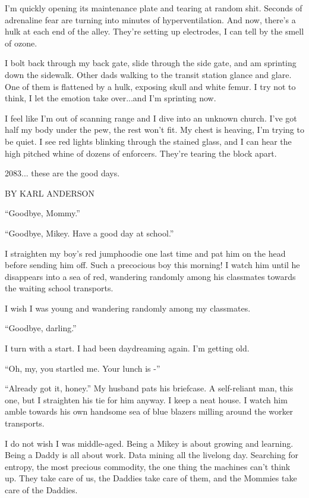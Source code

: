 \documentclass{amsbook}
\begin{document}
I'm quickly opening its maintenance plate and tearing at random shit.  Seconds of adrenaline fear are turning into minutes of hyperventilation.  And now, there's a hulk at each end of the alley.  They're setting up electrodes, I can tell by the smell of ozone.

I bolt back through my back gate, slide through the side gate, and am sprinting down the sidewalk.  Other dads walking to the transit station glance and glare.  One of them is flattened by a hulk, exposing skull and white femur.  I try not to think, I let the emotion take over...and I'm sprinting now.

I feel like I'm out of scanning range and I dive into an unknown church.  I've got half my body under the pew, the rest won't fit.  My chest is heaving, I'm trying to be quiet.  I see red lights blinking through the stained glass, and I can hear the high pitched whine of dozens of enforcers.  They're tearing the block apart.

2083... these are the good days.
\clearpage

{\ROBOFONTx BY KARL ANDERSON}
\vskip 36pt

``Goodbye, Mommy.''

``Goodbye, Mikey.  Have a good day at school.''

I straighten my boy's red jumphoodie one last time and pat him on the head before sending him off.  Such a precocious boy this morning!  I watch him until he disappears into a sea of red, wandering randomly among his classmates towards the waiting school transports.

I wish I was young and wandering randomly among my classmates.

``Goodbye, darling.''

I turn with a start.  I had been daydreaming again.  I'm getting old.

``Oh, my, you startled me.  Your lunch is -''

``Already got it, honey.''  My husband pats his briefcase.  A self-reliant man, this one, but I straighten his tie for him anyway.  I keep a neat house.  I watch him amble towards his own handsome sea of blue blazers milling around the worker transports.

I do not wish I was middle-aged.  Being a Mikey is about growing and learning.  Being a Daddy is all about work.  Data mining all the livelong day.  Searching for entropy, the most precious commodity, the one thing the machines can't think up.  They take care of us, the Daddies take care of them, and the Mommies take care of the Daddies.
\end{document}
